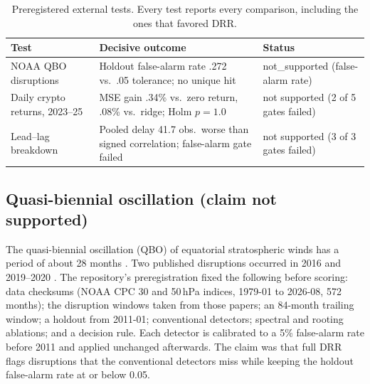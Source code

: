 \documentclass[10pt,twocolumn,letterpaper]{article}
\theoremstyle{definition}
\theoremstyle{remark}
\begin{document}
\begin{table}[t]
\centering\footnotesize
\caption{Preregistered external tests. Every test reports every comparison,
including the ones that favored DRR.}
\label{tab:external}
\setlength{\tabcolsep}{3pt}
\begin{tabular}{@{}L{0.21\columnwidth}L{0.42\columnwidth}L{0.29\columnwidth}@{}}
\toprule
Test & Decisive outcome & Status\\
\midrule
NOAA QBO disruptions & Holdout false-alarm rate .272 vs.\ .05 tolerance; no unique hit & not\_supported (false-alarm rate)\\
\addlinespace
Daily crypto returns, 2023--25 & MSE gain .34\% vs.\ zero return, .08\% vs.\ ridge; Holm $p=1.0$ & not supported (2 of 5 gates failed)\\
\addlinespace
Lead--lag breakdown & Pooled delay 41.7 obs.\ worse than signed correlation; false-alarm gate failed & not supported (3 of 3 gates failed)\\
\bottomrule
\end{tabular}
\end{table}

\subsection{Quasi-biennial oscillation (claim not supported)}

The quasi-biennial oscillation (QBO) of equatorial stratospheric winds has a
period of about 28 months \cite{baldwin}. Two published disruptions occurred in
2016 \cite{osprey,newman} and 2019--2020 \cite{anstey}. The repository's
preregistration fixed the following before scoring: data checksums (NOAA CPC 30
and 50\,hPa indices, 1979-01 to 2026-08, 572 months); the disruption windows
taken from those papers; an 84-month trailing window; a holdout from 2011-01;
conventional detectors; spectral and rooting ablations; and a decision rule.
Each detector is calibrated to a 5\% false-alarm rate before 2011 and applied
unchanged afterwards. The claim was that full DRR flags disruptions that the
conventional detectors miss while keeping the holdout false-alarm rate at or
below 0.05.
\end{document}
